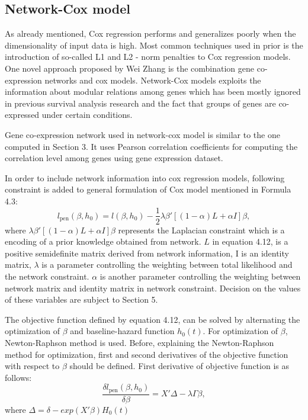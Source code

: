 \documentclass{ba-kecs}
\numberwithin{figure}{section}
\numberwithin{equation}{section}
\begin{document}
\subsection{Network-Cox model}

As already mentioned, Cox regression performs and generalizes poorly when the dimensionality of input data is high. Most common techniques used in prior is the introduction of so-called L1 and L2 - norm penalties to Cox regression models. One novel approach proposed by Wei Zhang \cite{netcox} is the combination gene co-expression networks and cox models. Network-Cox models exploits the information about modular relations among genes which has been mostly ignored in previous survival analysis research and the fact that groups of genes are co-expressed under certain conditions.

Gene co-expression network used in network-cox model is similar to the one computed in Section 3. It uses Pearson correlation coefficients for computing the correlation level among genes using gene expression dataset.

In order to include network information into cox regression models, following constraint is added to general formulation of Cox model mentioned in Formula 4.3:
\begin{equation}
l_\mathrm{pen}(\beta , h_{0}) = l(\beta,h_{0}) - \dfrac{1}{2} \lambda \beta '[(1 - \alpha)L + \alpha{I}]\beta ,
\end{equation}
where $ \lambda \beta '[(1 - \alpha)L + \alpha{I}]\beta $ represents the Laplacian constraint which is a encoding of a prior knowledge obtained from network. $L$ in equation 4.12, is a positive semidefinite matrix derived from network information, I is an identity matrix, $\lambda$ is a parameter controlling the weighting between total likelihood and the network constraint. $\alpha$ is another parameter controlling the weighting between network matrix and identity matrix in network constraint. Decision on the values of these variables are subject to Section 5.

The objective function defined by equation 4.12, can be solved by alternating the optimization of $\beta$ and baseline-hazard function $h_{0}(t)$. For optimization of $\beta$, Newton-Raphson method is used. Before, explaining the Newton-Raphson method for optimization, first and second derivatives of the objective function with respect to $\beta$ should be defined. First derivative of objective function is as follows:
\begin{equation}
\dfrac{\delta{l_\mathrm{pen}(\beta , h_{0})}}{\delta{\beta}} = X'\Delta - \lambda{\Gamma}\beta ,
\end{equation}
where $\Delta = \delta - exp(X'\beta)H_{0}(t)$
\end{document}
